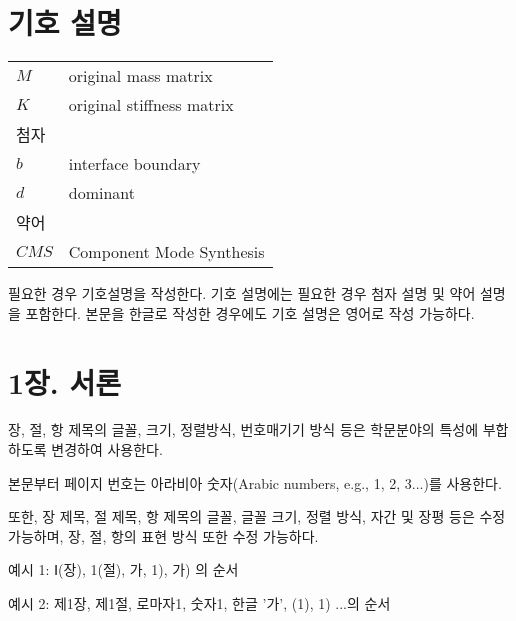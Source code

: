 \documentclass[11pt]{report}
\begin{document}


\newpage
{}
\chapter*{기호 설명}

\normalsize
\begin{tabular}{p{}p{}}
$M$	& original mass matrix\\
$K$	& original stiffness matrix\\[30pt]
\multicolumn{2}{l}{첨자}\\
$b$ & interface boundary\\
$d$ & dominant\\[30pt]
\multicolumn{2}{l}{약어}\\
$CMS$ & Component Mode Synthesis\\
\end{tabular}

\vspace{1cm}

필요한 경우 기호설명을 작성한다. 기호 설명에는 필요한 경우 첨자 설명 및 약어 설명을 포함한다. 본문을 한글로 작성한 경우에도 기호 설명은 영어로 작성 가능하다.


\chapter*{1장. 서론}
\setcounter{chapter}{1}

장, 절, 항 제목의 글꼴, 크기, 정렬방식, 번호매기기 방식 등은 학문분야의 특성에 부합하도록 변경하여 사용한다. \par
본문부터 페이지 번호는 아라비아 숫자(Arabic numbers, e.g., 1, 2, 3...)를 사용한다.\par
또한, 장 제목, 절 제목, 항 제목의 글꼴, 글꼴 크기, 정렬 방식, 자간 및 장평 등은 수정 가능하며, 장, 절, 항의 표현 방식 또한 수정 가능하다. \par
\bigskip
예시 1: Ⅰ(장), 1(절), 가, 1), 가) 의 순서 \par
예시 2: 제1장, 제1절, 로마자1, 숫자1, 한글 '가', (1), 1) ...의 순서 \par
\bigskip
\end{document}
